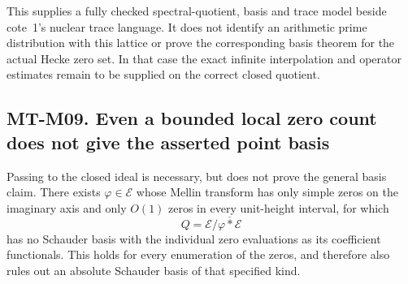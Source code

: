 This supplies a fully checked spectral-quotient, basis and trace
model beside cote~1's nuclear trace language. It does not identify
an arithmetic prime distribution with this lattice or prove the
corresponding basis theorem for the actual Hecke zero set. In that
case the exact infinite interpolation and operator estimates remain
to be supplied on the correct closed quotient.

\subsection*{MT-M09. Even a bounded local zero count does not give the asserted point basis}
Passing to the closed ideal is necessary, but does not prove the
general basis claim. There exists $\varphi\in\mathcal E$ whose Mellin
transform has only simple zeros on the imaginary axis and only
$O(1)$ zeros in every unit-height interval, for which
\[
        Q=\mathcal E/\overline{\varphi*\mathcal E}
\]
has no Schauder basis with the individual zero evaluations as its
coefficient functionals. This holds for every enumeration of the
zeros, and therefore also rules out an absolute Schauder basis of
that specified kind.

